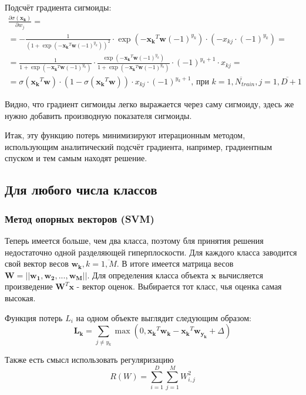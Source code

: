 \documentclass[a4paper]{article}
\newcommand{\w}{\bm{w}}
\newcommand{\wk}{\bm{w_k}}
\newcommand{\yk}{y_k}
\newcommand{\xk}{\bm{x_k}}
\newcommand{\xkj}{x_{kj}}
\newcommand{\W}{\bm{W}}
\begin{document}
Подсчёт градиента сигмоиды: 
\begin{multline*}
\frac{\partial \sigma(\xk)}{\partial w_j} = \\ = - \frac{1}{(1 + \exp(-\xk^T\w(-1)^{\yk}))^2} \cdot \exp(-\xk^T\w(-1)^{\yk}) \cdot (-\xkj\cdot(-1)^{\yk})=  \\ =
\frac{1}{1 + \exp(-\xk^T\w(-1)^{\yk})} \cdot \frac{\exp(-\xk^T\w(-1)^{\yk})}{1 + \exp(-\xk^T\w(-1)^{\yk})} \cdot (-1)^{\yk + 1} \cdot \xkj = \\ =
\sigma(\xk^T\w) \cdot (1 - \sigma(\xk^T\w)) \cdot \xkj \cdot (-1)^{\yk + 1} \text{, при } k = \overline{1, N_{train}}, j = \overline{1, D + 1}
\end{multline*}

Видно, что градиент сигмоиды легко выражается через саму сигмоиду, здесь же нужно добавить производную показателя сигмоиды.

Итак, эту функцию потерь минимизируют итерационным методом, использующим аналитический подсчёт градиента, например, градиентным спуском и тем самым находят решение.

\subsection{Для любого числа классов}

\subsubsection{Метод опорных векторов (SVM)}

Теперь имеется больше, чем два класса, поэтому бля принятия решения недостаточно одной разделяющей гиперплоскости. Для каждого класса заводится свой вектор весов $\wk, k = \overline{1, M}$. В итоге имеется матрица весов $\W = ||\bm{w_1}, \bm{w_2}, ..., \bm{w_M}||$. Для определения класса объекта $\bm{x}$ вычисляется произведение $\W^T\bm{x}$ - вектор оценок. Выбирается тот класс, чья оценка самая высокая.

Функция потерь $L_i$ на одном объекте выглядит следующим образом:
\begin{equation}
\bm{L_k} = \sum_{j \neq y_k}\max{(0, \xk^T\wk - \xk^T\bm{w_{y_k}} + \Delta)}
\end{equation}

Также есть смысл использовать регуляризацию 
\begin{equation}
R(W) = \sum_{i = 1}^{D}\sum_{j = 1}^M W_{i,j}^2
\end{equation}
\end{document}
